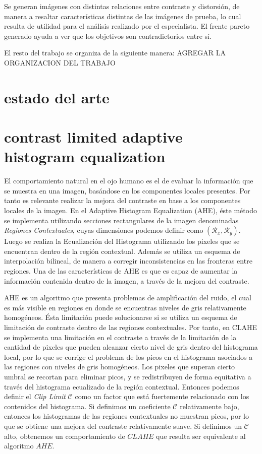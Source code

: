 \documentclass[spanish]{article}
\begin{document}
Se generan imágenes con distintas relaciones entre contraste y distorsión, de manera a resaltar características distintas de las imágenes de prueba, lo cual resulta de utilidad para el análisis realizado por el especialista. El frente pareto generado ayuda a ver que los objetivos son contradictorios entre sí.

El resto del trabajo se organiza de la siguiente manera: {\color{red} AGREGAR LA ORGANIZACION DEL TRABAJO}


\section{estado del arte}

\section{contrast limited adaptive histogram equalization}
\label{sec:clahe}

El comportamiento natural en el ojo humano es el de evaluar la información que se muestra en una imagen, basándose en los componentes locales presentes. Por tanto es relevante realizar la mejora del contraste en base a los componentes locales de la imagen. En el Adaptive Histogram Equalization (AHE), éste método se implementa utilizando secciones rectangulares de la imagen denominadas {\it Regiones Contextuales}, cuyas dimensiones podemos definir como $(\mathcal{R}_x, \mathcal{R}_y)$. Luego se realiza la Ecualización del Histograma utilizando los pixeles que se encuentran dentro de la región contextual. Además se utiliza un esquema de interpolación bilineal, de manera a corregir inconsistencias en las fronteras entre regiones. Una de las características de AHE es que es capaz de aumentar la información contenida dentro de la imagen, a través de la mejora del contraste\cite{zimmerman1988evaluation}.

AHE es un algoritmo que presenta problemas de amplificación del ruido, el cual es más visible en regiones en donde se encuentras niveles de gris relativamente homogéneos. Ésta limitación puede solucionarse si se utiliza un esquema de limitación de contraste dentro de las regiones contextuales. Por tanto, en CLAHE se implementa una limitación en el contraste a través de la limitación de la cantidad de pixeles que pueden alcanzar cierto nivel de gris dentro del histograma local, por lo que se corrige el problema de los picos en el histograma asociados a las regiones con niveles de gris homogéneos. Los pixeles que superan cierto umbral se recortan para eliminar picos, y se redistribuyen de forma equitativa a través del histograma ecualizado de la región contextual. Entonces podemos definir el {\it Clip Limit} $\mathcal{C}$ como un factor que está fuertemente relacionado con los contenidos del histograma. Si definimos un coeficiente $\mathcal{C}$ relativamente bajo, entonces los histogramas de las regiones contextuales no muestran picos, por lo que se obtiene una mejora del contraste relativamente suave. Si definimos un $\mathcal{C}$ alto, obtenemos un comportamiento de $CLAHE$ que resulta ser equivalente al algoritmo $AHE$.
\end{document}
